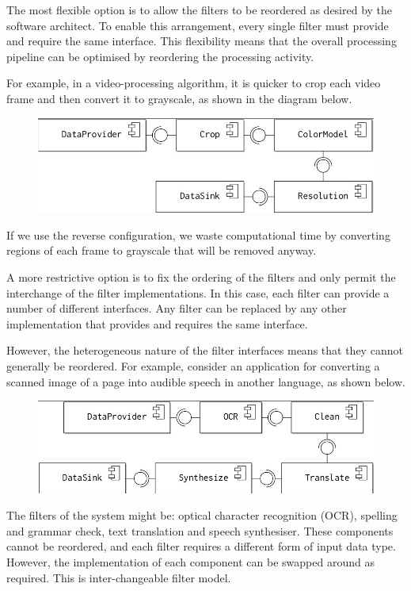 \documentclass[a4paper, openany]{memoir}
\begin{document}
The most flexible option is to allow the filters to be reordered as desired by the software architect. To enable this arrangement, every single filter must provide and require the same interface. This flexibility means that the overall processing pipeline can be optimised by reordering the processing activity.

For example, in a video-processing algorithm, it is quicker to crop each video frame and then convert it to grayscale, as shown in the diagram below.
\begin{figure}[H]
    \centering
    \includegraphics[scale=0.4]{src/14.17 reorderable.png}
\end{figure}
\noindent If we use the reverse configuration, we waste computational time by converting regions of each frame to grayscale that will be removed anyway.

A more restrictive option is to fix the ordering of the filters and only permit the interchange of the filter implementations. In this case, each filter can provide a number of different interfaces. Any filter can be replaced by any other implementation that provides and requires the same interface. 

However, the heterogeneous nature of the filter interfaces means that they cannot generally be reordered. For example, consider an application for converting a scanned image of a page into audible speech in another language, as shown below.
\begin{figure}[H]
    \centering
    \includegraphics[scale=0.4]{src/14.18 interchangeable.png}
\end{figure}
\noindent The filters of the system might be: optical character recognition (OCR), spelling and grammar check, text translation and speech synthesiser. These components cannot be reordered, and each filter requires a different form of input data type. However, the implementation of each component can be swapped around as required. This is inter-changeable filter model.
\end{document}
